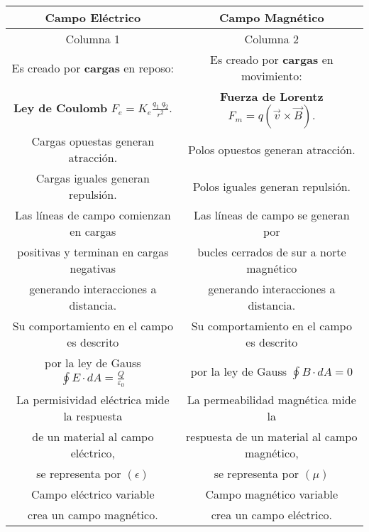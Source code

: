 \documentclass[a4paper,12pt]{article} %
\begin{document}
\begin{longtable}{|c|c|}
    
    \hline
    \textbf{Campo Eléctrico} &  \textbf{Campo Magnético} \\ \hline
    \endfirsthead \hline

    Columna 1 & Columna 2\\ \hline
    \endhead

    Es creado por \textbf{cargas} en reposo:  & Es creado por \textbf{cargas} en movimiento: \\ 

    \textbf{Ley de Coulomb} \(F_e = K_e \frac{q_1 \; q_2 }{r^2}\). & \textbf{Fuerza de Lorentz} \(F_m = q (\vec{v} \times  \vec{B})\). \\ \hline

    Cargas opuestas generan atracción.    &  Polos opuestos generan atracción. \\ \hline

    Cargas iguales generan repulsión.    & Polos iguales generan repulsión.  \\ \hline

    Las líneas de campo comienzan en cargas  & Las líneas de campo se generan por  \\ 

    positivas y terminan en cargas negativas & bucles cerrados de sur a norte magnético\\ 

    generando interacciones a distancia. & generando interacciones a distancia. \\ \hline

    Su comportamiento en el campo es descrito &  Su comportamiento en el campo es descrito \\

    por la ley de Gauss \(\oint E \cdot d A = \frac{Q}{\varepsilon _0} \) & por la ley de Gauss \(\oint B \cdot d A = 0\) \\ \hline

    La permisividad eléctrica mide la respuesta & La permeabilidad magnética mide la \\

    de un material al campo eléctrico, & respuesta de un material al campo magnético, \\

    se representa por \((\epsilon)\) & se representa por \((\mu)\) \\ \hline 

    Campo eléctrico variable  & Campo magnético variable \\ 

    crea un campo magnético. & crea un campo eléctrico. \\ \hline 




\end{longtable}
\end{document}
